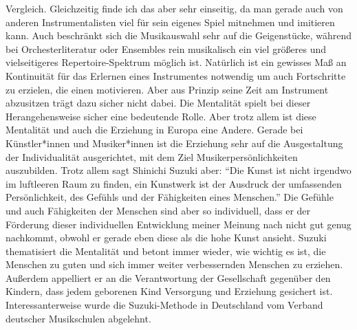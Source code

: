 Vergleich. Gleichzeitig finde ich das aber sehr einseitig, da man gerade auch
von anderen Instrumentalisten viel für sein eigenes Spiel mitnehmen und
imitieren kann. Auch beschränkt sich die Musikauswahl sehr auf die Geigenstücke,
während bei Orchesterliteratur oder Ensembles rein musikalisch ein viel
größeres und vielseitigeres Repertoire-Spektrum möglich ist. 
Natürlich ist ein
gewisses Maß an Kontinuität für das Erlernen eines Instrumentes notwendig um auch Fortschritte zu
erzielen, die einen motivieren. Aber aus Prinzip seine Zeit am Instrument
abzusitzen trägt dazu sicher nicht dabei. Die Mentalität spielt bei dieser
Herangehensweise sicher eine bedeutende Rolle. Aber trotz allem ist diese
Mentalität und auch die Erziehung in Europa eine Andere. Gerade bei Künstler*innen
und Musiker*innen ist die Erziehung sehr auf die Ausgestaltung der Individualität
ausgerichtet, mit dem Ziel Musikerpersönlichkeiten auszubilden. Trotz allem sagt
Shinichi Suzuki aber: \enquote{Die Kunst ist nicht irgendwo im luftleeren Raum
zu finden, ein Kunstwerk ist der Ausdruck der umfassenden Persönlichkeit, des
Gefühls und der Fähigkeiten eines Menschen.}
\autocite[103]{suzuki:erziehung_ist_liebe} Die Gefühle und auch Fähigkeiten der
Menschen sind aber so individuell, dass er der Förderung dieser individuellen
Entwicklung meiner Meinung nach nicht gut genug nachkommt, obwohl er gerade eben
diese als die hohe Kunst ansieht. Suzuki thematisiert die Mentalität und betont
immer wieder, wie wichtig es ist, die Menschen zu guten und sich immer weiter
verbessernden Menschen zu erziehen. Außerdem appelliert er an die Verantwortung
der Gesellschaft gegenüber den Kindern, dass jedem geborenen Kind Versorgung und
Erziehung gesichert ist. \autocite[130]{suzuki:erziehung_ist_liebe}
Interessanterweise wurde die Suzuki-Methode in Deutschland vom Verband deutscher
Musikschulen abgelehnt. \autocite[49]{ernst:die_zukunftsfaehige_musikschule}
